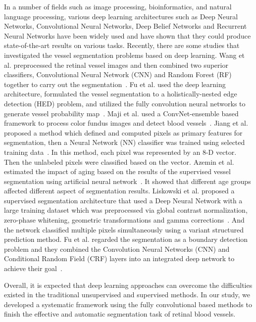 \documentclass[journal]{IEEEtran}
\begin{document}
In a number of fields such as image processing, bioinformatics, and natural language processing, various deep learning architectures such as Deep Neural Networks, Convolutional Neural Networks, Deep Belief Networks and Recurrent Neural Networks have been widely used and have shown that they could produce state-of-the-art results on various tasks. Recently, there are some studies that investigated the vessel segmentation problems based on deep learning. Wang et al. preprocessed the retinal vessel images and then combined two superior classifiers, Convolutional Neural Network (CNN) and Random Forest (RF) together to carry out the segmentation~\cite{wang_hierarchical_2015}. Fu et al. used the deep learning architecture, formulated the vessel segmentation to a holistically-nested edge detection (HED) problem, and utilized the fully convolution neural networks to generate vessel probability map~\cite{fu_retinal_2016}. Maji et al. used a ConvNet-ensemble based framework to process color fundus images and detect blood vessels~\cite{maji_ensemble_2016}. Jiang et al. proposed a method which defined and computed pixels as primary features for segmentation, then a Neural Network (NN) classifier was trained using selected training data~\cite{jiang_supervised_2015}. In this method, each pixel was represented by an 8-D vector. Then the unlabeled pixels were classified based on the vector. Azemin et al. estimated the impact of aging based on the results of the supervised vessel segmentation using artificial neural network~\cite{azemin_supervised_2014}. It showed that different age groups affected different aspect of segmentation results. Liskowski et al. proposed a supervised segmentation architecture that used a Deep Neural Network with a large training dataset which was preprocessed via global contrast normalization, zero-phase whitening, geometric transformations and gamma corrections~\cite{liskowski_segmenting_2016}. And the network classified multiple pixels simultaneously using a variant structured prediction method. Fu et al. regarded the segmentation as a boundary detection problem and they combined the Convolution Neural Networks (CNN) and Conditional Random Field (CRF) layers into an integrated deep network to achieve their goal~\cite{fu_deepvessel:_2016}.

Overall, it is expected that deep learning approaches can overcome the difficulties existed in the traditional unsupervised and supervised methods. In our study, we developed a systematic framework using the fully convolutional based methods to finish the effective and automatic segmentation task of retinal blood vessels.
\end{document}
